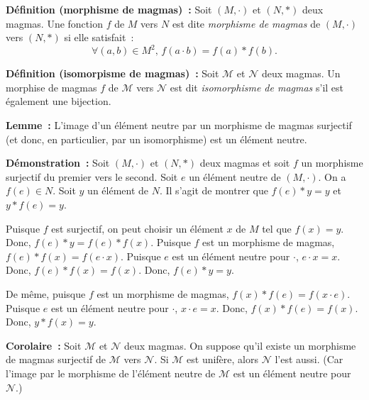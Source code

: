     \done

\medskip

\noindent\textbf{Définition (morphisme de magmas) :} Soit $\left(M, \cdot \right)$ et $\left(N, \ast \right)$ deux magmas.
    Une fonction $f$ de $M$ vers $N$ est dite \textit{morphisme de magmas} de $\left(M, \cdot \right)$ vers $\left(N, \ast \right)$ si elle satisfait : 
    \begin{equation*}
        \forall (a,b) \in M^2, \, f (a \cdot b) = f(a) \ast f(b) .
    \end{equation*}

\medskip

\noindent\textbf{Définition (isomorpisme de magmas) :} Soit $\mathcal{M}$ et $\mathcal{N}$ deux magmas.
    Un morphise de magmas $f$ de $\mathcal{M}$ vers $\mathcal{N}$ est dit \textit{isomorphisme de magmas} s'il est également une bijection.

\medskip

\noindent\textbf{Lemme :} L'image d'un élément neutre par un morphisme de magmas surjectif (et donc, en particulier, par un isomorphisme) est un élément neutre.

\medskip

\noindent\textbf{Démonstration :} Soit $\left(M, \cdot \right)$ et $\left(N, \ast \right)$ deux magmas et soit $f$ un morphisme surjectif du premier vers le second. 
    Soit $e$ un élément neutre de $\left(M, \cdot \right)$. 
    On a $f(e) \in N$. 
    Soit $y$ un élément de $N$. 
    Il s'agit de montrer que $f(e) \ast y = y$ et $y \ast f(e) = y$.

    Puisque $f$ est surjectif, on peut choisir un élément $x$ de $M$ tel que $f(x) = y$. 
    Donc, $f(e) \ast y = f(e) \ast f(x)$. 
    Puisque $f$ est un morphisme de magmas, $f(e) \ast f(x) = f(e \cdot x)$. 
    Puisque $e$ est un élément neutre pour $\cdot$, $e \cdot x = x$. 
    Donc, $f(e) \ast f(x) = f(x)$.
    Donc, $f(e) \ast y = y$. 

    De même, puisque $f$ est un morphisme de magmas, $f(x) \ast f(e) = f(x \cdot e)$. 
    Puisque $e$ est un élément neutre pour $\cdot$, $x \cdot e = x$. 
    Donc, $f(x) \ast f(e) = f(x)$.
    Donc, $y \ast f(x) = y$. 

    \hfill \square

\medskip

\noindent\textbf{Corolaire :} Soit $\mathcal{M}$ et $\mathcal{N}$ deux magmas. 
    On suppose qu'il existe un morphisme de magmas surjectif de $\mathcal{M}$ vers $\mathcal{N}$. 
    Si $\mathcal{M}$ est unifère, alors $\mathcal{N}$ l'est aussi. 
    (Car l'image par le morphisme de l'élément neutre de $\mathcal{M}$ est un élément neutre pour $\mathcal{N}$.)

